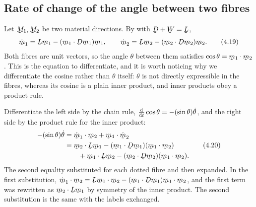 \subsection*{Rate of change of the angle between two fibres}

Let $\bM_{1},\bM_{2}$ be two material directions. By  with
$\bD+\bW=\bL$,
\begin{equation}
   \dot\bm_{1}=\bL\bm_{1}-(\ip{\bm_{1}}{\bD\bm_{1}})\bm_{1},
   \qquad
   \dot\bm_{2}=\bL\bm_{2}-(\ip{\bm_{2}}{\bD\bm_{2}})\bm_{2}.
   \tag{4.19}\label{eq:4.19}
\end{equation}
Both fibres are unit vectors, so the angle $\theta$ between them satisfies
$\cos\theta=\ip{\bm_{1}}{\bm_{2}}$. This is the equation to differentiate,
and it is worth noticing why we differentiate the cosine rather than
$\theta$ itself: $\theta$ is not directly expressible in the fibres,
whereas its cosine is a plain inner product, and inner products obey a
product rule.

Differentiate the left side by the chain rule,
$\frac{\mathrm{d}}{\mathrm{d} t}\cos\theta=-(\sin\theta)\dot\theta$, and the right side
by the product rule for the inner product:
\begin{equation}
\begin{aligned}
   -(\sin\theta)\dot\theta
   &=\ip{\dot\bm_{1}}{\bm_{2}}+\ip{\bm_{1}}{\dot\bm_{2}}\\
   &=\ip{\bm_{2}}{\bL\bm_{1}}
     -(\ip{\bm_{1}}{\bD\bm_{1}})(\ip{\bm_{1}}{\bm_{2}})\\
   &\qquad+\ip{\bm_{1}}{\bL\bm_{2}}
     -(\ip{\bm_{2}}{\bD\bm_{2}})(\ip{\bm_{1}}{\bm_{2}}).
\end{aligned}
   \tag{4.20}\label{eq:4.20}
\end{equation}
The second equality substituted  for each dotted fibre and then
expanded. In the first substitution, $\ip{\dot\bm_{1}}{\bm_{2}}
=\ip{\bL\bm_{1}}{\bm_{2}}-(\ip{\bm_{1}}{\bD\bm_{1}})\ip{\bm_{1}}{\bm_{2}}$,
and the first term was rewritten as $\ip{\bm_{2}}{\bL\bm_{1}}$ by symmetry
of the inner product. The second substitution is the same with the labels
exchanged.

